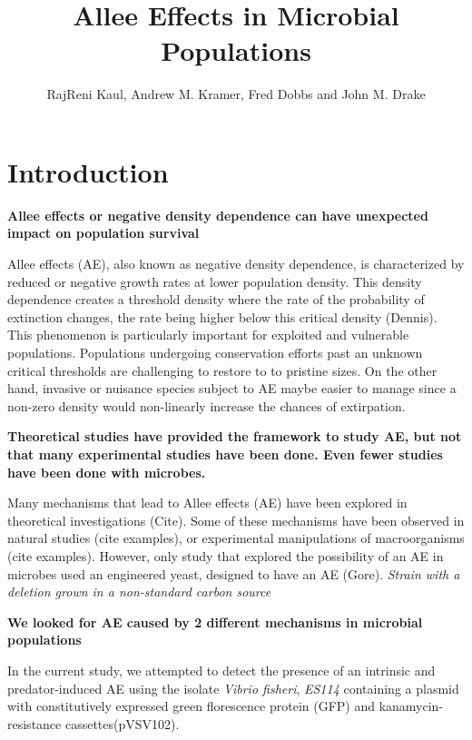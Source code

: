 \documentclass[a4paper,10pt]{article}
\title{Allee Effects in Microbial Populations}
\author{RajReni Kaul, Andrew M. Kramer, Fred Dobbs and John M. Drake}
\begin{document}
\maketitle

\begin{abstract}

\end{abstract}

\section{Introduction}
\textbf{Allee effects or negative density dependence can have unexpected impact on population survival}

Allee effects (AE), also known as negative density dependence, is characterized by reduced or negative growth rates at lower population density. This density dependence creates a threshold density where the rate of the probability of extinction changes, the rate being higher below this critical density (Dennis). This phenomenon is particularly important for exploited and vulnerable populations. Populations undergoing conservation efforts past an unknown critical thresholds are challenging to restore to to pristine sizes. On the other hand, invasive or nuisance species subject to AE maybe easier to manage since a non-zero density would non-linearly increase the chances of extirpation. 

\textbf{Theoretical studies have provided the framework to study AE, but not that many experimental studies have been done. Even fewer studies have been done with microbes. }

Many mechanisms that lead to Allee effects (AE) have been explored in theoretical investigations (Cite). Some of these mechanisms have been observed in natural studies (cite examples), or experimental manipulations of macroorganisms (cite examples). However, only study that explored the possibility of an AE in microbes used an engineered yeast, designed to have an AE (Gore). \textit{Strain with a deletion grown in a non-standard carbon source} 

\textbf{We looked for AE caused by 2 different mechanisms in microbial populations }

In the current study,  we attempted to detect the presence of an intrinsic and predator-induced AE using the isolate \textit{Vibrio fisheri}, \textit{ES114} containing a plasmid with constitutively expressed green florescence protein (GFP) and kanamycin-resistance cassettes(pVSV102).  
\end{document}

